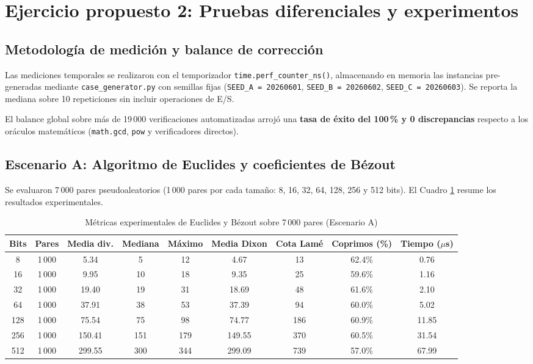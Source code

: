 \section{Ejercicio propuesto 2: Pruebas diferenciales y experimentos}

\subsection{Metodología de medición y balance de corrección}
Las mediciones temporales se realizaron con el temporizador \texttt{time.perf\_counter\_ns()}, almacenando en memoria las instancias pre-generadas mediante \texttt{case\_generator.py} con semillas fijas (\texttt{SEED\_A = 20260601}, \texttt{SEED\_B = 20260602}, \texttt{SEED\_C = 20260603}). Se reporta la mediana sobre 10 repeticiones sin incluir operaciones de E/S.

El balance global sobre más de 19\,000 verificaciones automatizadas arrojó una \textbf{tasa de éxito del 100\,\% y 0 discrepancias} respecto a los oráculos matemáticos (\texttt{math.gcd}, \texttt{pow} y verificadores directos).

\subsection{Escenario A: Algoritmo de Euclides y coeficientes de Bézout}
Se evaluaron 7\,000 pares pseudoaleatorios (1\,000 pares por cada tamaño: 8, 16, 32, 64, 128, 256 y 512 bits). El Cuadro \ref{tab:escenario_a_metricas} resume los resultados experimentales.

\begin{table}[H]
    \caption{Métricas experimentales de Euclides y Bézout sobre 7\,000 pares (Escenario A)}
    \label{tab:escenario_a_metricas}
    \centering
    \scriptsize
    \begin{tabular*}{\textwidth}{@{\extracolsep{\fill}}ccccccccc}
        \toprule
        Bits & Pares & Media div. & Mediana & Máximo & Media Dixon & Cota Lamé & Coprimos (\%) & Tiempo ($\mu$s) \\
        \midrule
        8   & 1\,000 & 5.34   & 5   & 12  & 4.67   & 13  & 62.4\% & 0.76 \\
        16  & 1\,000 & 9.95   & 10  & 18  & 9.35   & 25  & 59.6\% & 1.16 \\
        32  & 1\,000 & 19.40  & 19  & 31  & 18.69  & 48  & 61.6\% & 2.10 \\
        64  & 1\,000 & 37.91  & 38  & 53  & 37.39  & 94  & 60.0\% & 5.02 \\
        128 & 1\,000 & 75.54  & 75  & 98  & 74.77  & 186 & 60.9\% & 11.85 \\
        256 & 1\,000 & 150.41 & 151 & 179 & 149.55 & 370 & 60.5\% & 31.54 \\
        512 & 1\,000 & 299.55 & 300 & 344 & 299.09 & 739 & 57.0\% & 67.99 \\
        \bottomrule
    \end{tabular*}
\end{table}


